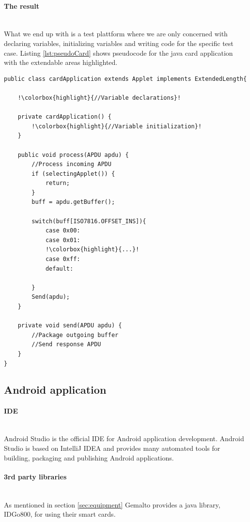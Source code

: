 \paragraph{The result}\mbox{}\\
What we end up with is a test plattform where we are only concerned with declaring variables, initializing variables and writing code for the specific test case. Listing \ref{lst:pseudoCard} shows pseudocode for the java card application with the extendable areas highlighted.


\begin{lstlisting}[caption=Pseudo code for javacard test application., label=lst:pseudoCard,escapechar=!]
public class cardApplication extends Applet implements ExtendedLength{

    !\colorbox{highlight}{//Variable declarations}!

    private cardApplication() {
    	!\colorbox{highlight}{//Variable initialization}!
    }

    public void process(APDU apdu) {
    	//Process incoming APDU
        if (selectingApplet()) {
			return;
		}
        buff = apdu.getBuffer();

    	switch(buff[ISO7816.OFFSET_INS]){
            case 0x00:
            case 0x01:
            !\colorbox{highlight}{...}!
            case 0xff:
            default:

    	}
    	Send(apdu);
    }

    private void send(APDU apdu) {
    	//Package outgoing buffer
    	//Send response APDU
    }
}
\end{lstlisting}

\fi %

\iffalse %

\subsection{Android application}
\paragraph{IDE}\mbox{}\\
Android Studio \cite{androidIDE} is the official IDE for Android application development. Android Studio is based on IntelliJ IDEA \cite{intelliJIDEA} and provides many automated tools for building, packaging and publishing Android applications.
\paragraph{3rd party libraries}\mbox{}\\
As mentioned in section \ref{sec:equipment} Gemalto provides a java library, IDGo800, for using their smart cards.

